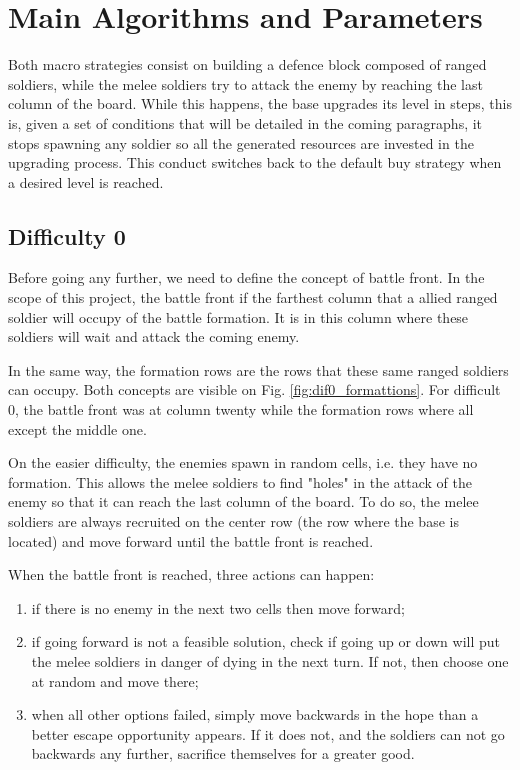 \documentclass[conference]{IEEEtran}
\begin{document}
\section{Main Algorithms and Parameters}

Both macro strategies consist on building a defence block composed of ranged soldiers, while the melee soldiers try to attack the enemy by reaching the last column of the board. While this happens, the base upgrades its level in steps, this is, given a set of conditions that will be detailed in the coming paragraphs, it stops spawning any soldier so all the generated resources are invested in the upgrading process. This conduct switches back to the default buy strategy when a desired level is reached.

\subsection{Difficulty 0}

Before going any further, we need to define the concept of battle front. In the scope of this project, the battle front if the farthest column that a allied ranged soldier will occupy of the battle formation. It is in this column where these soldiers will wait and attack the coming enemy. 

In the same way, the formation rows are the rows that these same ranged soldiers can occupy. Both concepts are visible on Fig. \ref{fig:dif0_formattions}. For difficult 0, the battle front was at column twenty while the formation rows where all except the middle one.

On the easier difficulty, the enemies spawn in random cells, i.e. they have no formation. This allows the melee soldiers to find "holes" in the attack of the enemy so that it can reach the last column of the board. To do so, the melee soldiers are always recruited on the center row (the row where the base is located) and move forward until the battle front is reached.

When the battle front is reached, three actions can happen: 
%
\begin{enumerate}
    \item if there is no enemy in the next two cells then move forward;
    \item if going forward is not a feasible solution, check if going up or down will put the melee soldiers in danger of dying in the next turn. If not, then choose one at random and move there;
    \item when all other options failed, simply move backwards in the hope than a better escape opportunity appears. If it does not, and the soldiers can not go backwards any further, sacrifice themselves for a greater good.
\end{enumerate}
\end{document}

